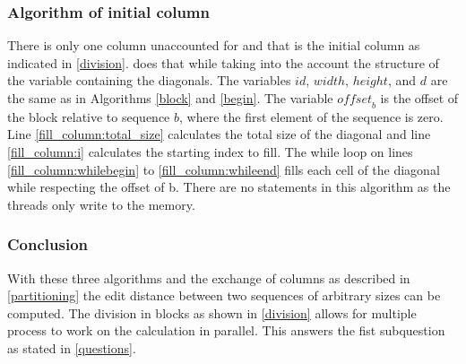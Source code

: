 \subsubsection{Algorithm of initial column}
There is only one column unaccounted for and that is the initial column as indicated in \cref{division}.
 does that while taking into the account the structure of the variable containing the diagonals.
The variables $id$, $width$, $height$, and $d$ are the same as in Algorithms \ref{block} and \ref{begin}.
The variable $\mathit{offset}_b$ is the offset of the block relative to sequence $b$, where the first element of the sequence is zero.
Line \ref{fill_column:total_size} calculates the total size of the diagonal and line \ref{fill_column:i} calculates the starting index to fill.
The while loop on lines \ref{fill_column:whilebegin} to \ref{fill_column:whileend} fills each cell of the diagonal while respecting the offset of b.
There are no  statements in this algorithm as the threads only write to the memory.

\subsubsection{Conclusion}
With these three algorithms and the exchange of columns as described in \cref{partitioning} the edit distance between two sequences of arbitrary sizes can be computed.
The division in blocks as shown in \cref{division} allows for multiple process to work on the calculation in parallel.
This answers the fist subquestion as stated in \cref{questions}.

